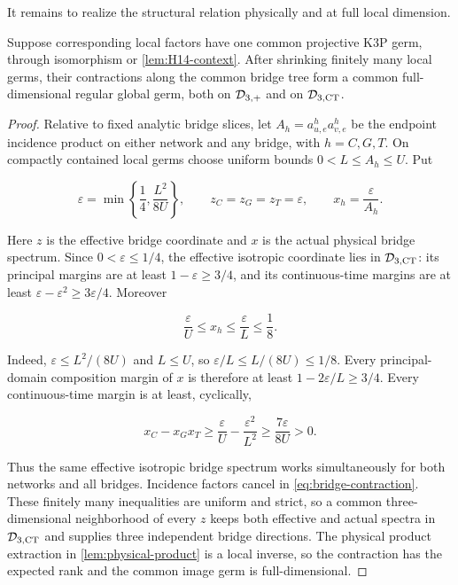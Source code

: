 It remains to realize the structural relation physically and at full local
dimension.

\begin{lemma}\label{lem:gluing}
Suppose corresponding local factors have one common projective K3P germ,
through isomorphism or \cref{lem:H14-context}.  After shrinking finitely many
local germs, their contractions along the common bridge tree form a common
full-dimensional regular global germ, both on \(\mathcal D_{3,+}\) and on \(\mathcal D_{3,\mathrm{CT}}\).
\end{lemma}

\begin{proof}
Relative to fixed analytic bridge slices, let
\(A_h=a^h_{u,e}a^h_{v,e}\) be the endpoint incidence product on either network
and any bridge, with \(h=C,G,T\).  On compactly contained local germs choose
uniform bounds \(0<L\le A_h\le U\).  Put

\[
 \varepsilon=\min\left\{\frac14,\frac{L^2}{8U}\right\},\qquad
 z_C=z_G=z_T=\varepsilon,\qquad
 x_h=\frac{\varepsilon}{A_h}.
\]

Here \(z\) is the effective bridge coordinate and \(x\) is the actual
physical bridge spectrum.  Since \(0<\varepsilon\le1/4\), the effective
isotropic coordinate lies in \(\mathcal D_{3,\mathrm{CT}}\): its principal margins are at least
\(1-\varepsilon\ge3/4\), and its continuous-time margins are at least
\(\varepsilon-\varepsilon^2\ge3\varepsilon/4\).  Moreover

\[
 \frac{\varepsilon}{U}\le x_h\le\frac{\varepsilon}{L}\le\frac18.
\]

Indeed, \(\varepsilon\le L^2/(8U)\) and \(L\le U\), so
 \(\varepsilon/L\le L/(8U)\le1/8\).
Every principal-domain composition margin of \(x\) is therefore at least
\(1-2\varepsilon/L\ge3/4\).  Every continuous-time margin is at least,
cyclically,

\[
 x_C-x_Gx_T
 \ge\frac{\varepsilon}{U}-\frac{\varepsilon^2}{L^2}
 \ge\frac{7\varepsilon}{8U}>0.
\]

Thus the same effective isotropic bridge spectrum works simultaneously for
both networks and all bridges.  Incidence factors cancel in
\eqref{eq:bridge-contraction}.  These finitely many inequalities are
uniform and strict, so a common three-dimensional neighborhood of every
\(z\) keeps both effective and actual spectra in \(\mathcal D_{3,\mathrm{CT}}\) and supplies
three independent bridge directions.  The physical product extraction in
\cref{lem:physical-product} is a local inverse, so the contraction has the
expected rank and the common image germ is full-dimensional.
\end{proof}

